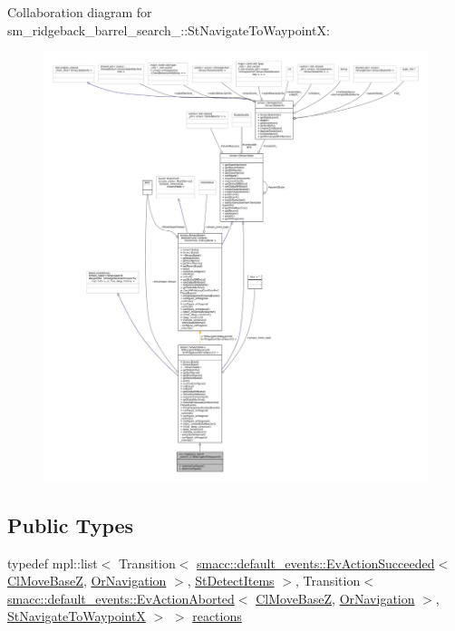 Collaboration diagram for sm\+\_\+ridgeback\+\_\+barrel\+\_\+search\+\_\+:\+:St\+Navigate\+To\+WaypointX\+:
\nopagebreak
\begin{figure}[H]
\begin{center}
\leavevmode
\includegraphics[width=350pt]{structsm__ridgeback__barrel__search__2_1_1StNavigateToWaypointX__coll__graph}
\end{center}
\end{figure}
\subsection*{Public Types}
\begin{DoxyCompactItemize}
\item 
typedef mpl\+::list$<$ Transition$<$ \hyperlink{structsmacc_1_1default__events_1_1EvActionSucceeded}{smacc\+::default\+\_\+events\+::\+Ev\+Action\+Succeeded}$<$ \hyperlink{classcl__move__base__z_1_1ClMoveBaseZ}{Cl\+Move\+BaseZ}, \hyperlink{classsm__ridgeback__barrel__search__2_1_1OrNavigation}{Or\+Navigation} $>$, \hyperlink{structsm__ridgeback__barrel__search__2_1_1StDetectItems}{St\+Detect\+Items} $>$, Transition$<$ \hyperlink{structsmacc_1_1default__events_1_1EvActionAborted}{smacc\+::default\+\_\+events\+::\+Ev\+Action\+Aborted}$<$ \hyperlink{classcl__move__base__z_1_1ClMoveBaseZ}{Cl\+Move\+BaseZ}, \hyperlink{classsm__ridgeback__barrel__search__2_1_1OrNavigation}{Or\+Navigation} $>$, \hyperlink{structsm__ridgeback__barrel__search__2_1_1StNavigateToWaypointX}{St\+Navigate\+To\+WaypointX} $>$ $>$ \hyperlink{structsm__ridgeback__barrel__search__2_1_1StNavigateToWaypointX_a801d5488fab09c21cda6f5fbc0840d36}{reactions}
\end{DoxyCompactItemize}
